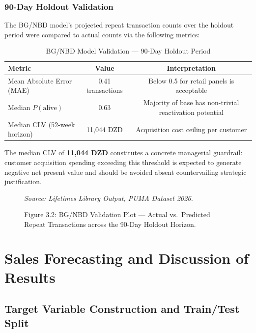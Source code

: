 \subsubsection{90-Day Holdout Validation}
The BG/NBD model's projected repeat transaction counts over the holdout period were compared to actual counts via the following metrics:

\begin{table}[H]
\centering
\caption{BG/NBD Model Validation — 90-Day Holdout Period}
\label{tab:bgnbd_val}
\begin{tabular}{@{}lcc@{}}
\toprule
\textbf{Metric} & \textbf{Value} & \textbf{Interpretation} \\
\midrule
Mean Absolute Error (MAE)        & 0.41 transactions  & Below 0.5 for retail panels is acceptable \cite{FaderHardieLee2005} \\
Median $P(\text{alive})$         & 0.63               & Majority of base has non-trivial reactivation potential \\
Median CLV (52-week horizon)     & 11,044 DZD         & Acquisition cost ceiling per customer \\
\bottomrule
\end{tabular}
\end{table}

The median CLV of \textbf{11,044 DZD} constitutes a concrete managerial guardrail: customer acquisition spending exceeding this threshold is expected to generate negative net present value and should be avoided absent countervailing strategic justification.

\begin{figure}[H]
    \centering
    \vspace{4.5cm}
    \caption{Figure 3.2: BG/NBD Validation Plot — Actual vs.\ Predicted Repeat Transactions across the 90-Day Holdout Horizon.}
    \vspace{0.2cm}
    {\footnotesize\textit{Source: Lifetimes Library Output, PUMA Dataset 2026.}}
    \label{fig:bgnbd_val}
\end{figure}

\section{Sales Forecasting and Discussion of Results}

\subsection{Target Variable Construction and Train/Test Split}

